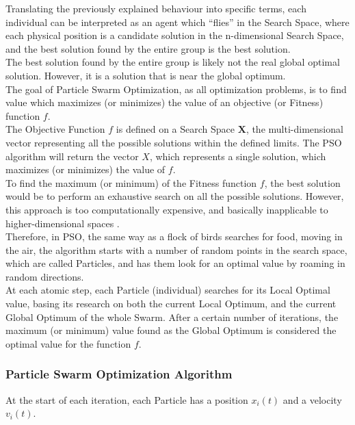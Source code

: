 Translating the previously explained behaviour into specific terms, each individual can be interpreted as an agent which “flies” in the Search Space, where each physical position is a candidate solution in the n-dimensional Search Space, and the best solution found by the entire group is the best solution.
\\[0.3cm]The best solution found by the entire group is likely not the real global optimal solution. However, it is a solution that is near the global optimum.
% 
\\[0.3cm]The goal of Particle Swarm Optimization, as all optimization problems, is to find value which maximizes (or minimizes) the value of an objective (or Fitness) function $f$.
\\[0.3cm]The Objective Function $f$ is defined on a Search Space {$\textbf{X}$}, the multi-dimensional vector representing all the possible solutions within the defined limits.
The PSO algorithm will return the vector $X$, which represents a single solution, which maximizes (or minimizes) the value of $f$.
% 
\\[0.3cm]To find the maximum (or minimum) of the Fitness function $f$, the best solution would be to perform an exhaustive search on all the possible solutions. However, this approach is too computationally expensive, and basically inapplicable to higher-dimensional spaces \cite{Tesi-3.1}.
\\[0.3cm]Therefore, in PSO, the same way as a flock of birds searches for food, moving in the air, the algorithm starts with a number of random points in the search space, which are called Particles, and has them look for an optimal value by roaming in random directions.
\\[0.3cm]At each atomic step, each Particle (individual) searches for its Local Optimal value, basing its research on both the current Local Optimum, and the current Global Optimum of the whole Swarm.
After a certain number of iterations, the maximum (or minimum) value found as the Global Optimum is considered the optimal value for the function $f$.

\subsubsection{Particle Swarm Optimization Algorithm}

At the start of each iteration, each Particle has a position $x_i(t)$ and a velocity $v_i(t)$.

